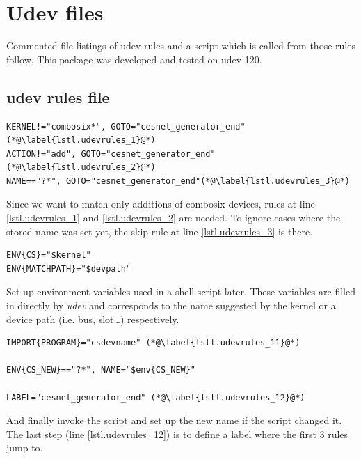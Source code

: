 
\appendix
  \chapter{Udev files}
  \label{app.udev}
  Commented file listings of udev rules and a script which is called from
  those rules follow. This package was developed and tested on udev 120.

  \section{udev rules file}
\begin{lstlisting}[language={},label=lst.udevrules,name=lst.udevrules]
KERNEL!="combosix*", GOTO="cesnet_generator_end"(*@\label{lstl.udevrules_1}@*)
ACTION!="add", GOTO="cesnet_generator_end"(*@\label{lstl.udevrules_2}@*)
NAME=="?*", GOTO="cesnet_generator_end"(*@\label{lstl.udevrules_3}@*)
\end{lstlisting}
  Since we want to match only additions of combosix devices, rules at line
  \ref{lstl.udevrules_1} and \ref{lstl.udevrules_2} are needed. To ignore
  cases where the stored name was set yet, the skip rule at line
  \ref{lstl.udevrules_3} is there.
\begin{lstlisting}[name=lst.udevrules]
ENV{CS}="$kernel"
ENV{MATCHPATH}="$devpath"
\end{lstlisting}
  Set up environment variables used in a shell script later. These variables are
  filled in directly by \emph{udev} and corresponds to the name suggested by
  the kernel or a device path (i.e. bus, slot\ldots) respectively.
\begin{lstlisting}[name=lst.udevrules]
IMPORT{PROGRAM}="csdevname" (*@\label{lstl.udevrules_11}@*)

ENV{CS_NEW}=="?*", NAME="$env{CS_NEW}"

LABEL="cesnet_generator_end" (*@\label{lstl.udevrules_12}@*)
\end{lstlisting}
  And finally invoke the script and set up the new name if the script changed
  it. The last step (line \ref{lstl.udevrules_12}) is to define a label where
  the first 3 rules jump to.

